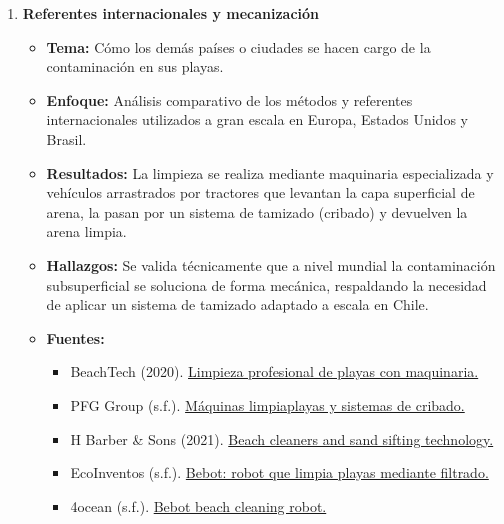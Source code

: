\documentclass[12pt,a4paper]{article}
\begin{document}
\begin{enumerate}[label=\textbf{\Large\arabic*.}, leftmargin=0pt, labelsep=10pt]
	      \vfill %

	\item \textbf{Referentes internacionales y mecanización}
	      \begin{itemize}[label=\textbullet]
		      \item \textbf{Tema:} Cómo los demás países o ciudades se hacen cargo de la contaminación en sus playas.
		      \item \textbf{Enfoque:} Análisis comparativo de los métodos y referentes internacionales utilizados a gran escala en Europa, Estados Unidos y Brasil.
		      \item \textbf{Resultados:} La limpieza se realiza mediante maquinaria especializada y vehículos arrastrados por tractores que levantan la capa superficial de arena, la pasan por un sistema de tamizado (cribado) y devuelven la arena limpia.
		      \item \textbf{Hallazgos:} Se valida técnicamente que a nivel mundial la contaminación subsuperficial se soluciona de forma mecánica, respaldando la necesidad de aplicar un sistema de tamizado adaptado a escala en Chile.
		      \item \textbf{Fuentes:}
		            \begin{small}
			            \begin{itemize}[label=-]
				            \item BeachTech (2020). \href{https://www.beach-tech.com}{Limpieza profesional de playas con maquinaria.}
				            \item PFG Group (s.f.). \href{https://www.pfgitalia.com}{Máquinas limpiaplayas y sistemas de cribado.}
				            \item H Barber \& Sons (2021). \href{https://www.hbarber.com}{Beach cleaners and sand sifting technology.}
				            \item EcoInventos (s.f.). \href{https://ecoinventos.com/bebot}{Bebot: robot que limpia playas mediante filtrado.}
				            \item 4ocean (s.f.). \href{https://www.4ocean.com}{Bebot beach cleaning robot.}
			            \end{itemize}
		            \end{small}
	      \end{itemize}

	      \newpage


\end{enumerate}
\end{document}
